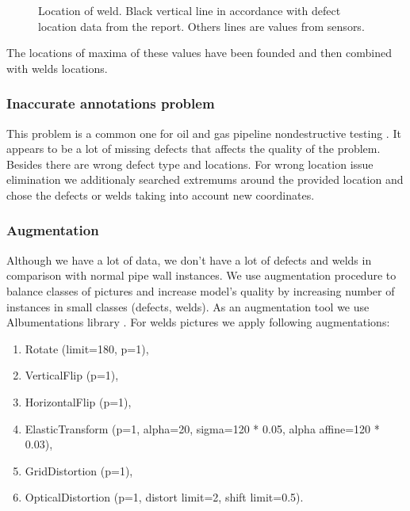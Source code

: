 \begin{figure}[!h]
	\caption{Location of weld. Black vertical line in accordance with defect location data from the report. Others lines are values from sensors.}
	\label{ris:prepr}
\end{figure}
The locations of maxima of these values have been founded and then combined with welds locations.


\subsubsection{Inaccurate annotations problem}
This problem is a common one for oil and gas pipeline nondestructive testing \cite{Khodayari-Rostamabad2009}.
It appears to be a lot of missing defects that affects the quality of the problem.
Besides there are wrong defect type and locations.
For wrong location issue elimination we additionaly searched extremums around the provided location and chose the defects or welds taking into account new coordinates.

\subsubsection{Augmentation}
Although we have a lot of data, we don't have a lot of defects and welds in comparison with normal pipe wall instances.
We use augmentation procedure to balance classes of pictures and increase model's quality by increasing number of instances in small classes (defects, welds).
As an augmentation tool we use Albumentations library \cite{buslaev2020albumentations}.
For welds pictures we apply following augmentations:
\begin{enumerate}
	\item Rotate (limit=180, p=1),
	\item VerticalFlip (p=1), 
	\item HorizontalFlip (p=1), 
	\item ElasticTransform (p=1, alpha=20, sigma=120 * 0.05, alpha affine=120 * 0.03), 
	\item GridDistortion (p=1),
	\item OpticalDistortion (p=1, distort limit=2, shift limit=0.5).
\end{enumerate}

